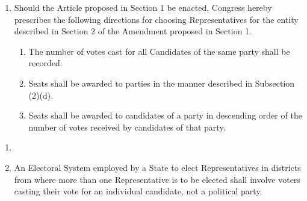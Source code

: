 \documentclass{article}
\begin{document}
    \begin{enumerate}
        \item Should the Article proposed in Section 1 be enacted, Congress hereby prescribes the following directions for choosing Representatives for the entity described in Section 2 of the Amendment proposed in Section 1. 
        \begin{enumerate}
            \item The number of votes cast for all Candidates of the same party shall be recorded.
            \item Seats shall be awarded to parties in the manner described in Subsection (2)(d).
            \item Seats shall be awarded to candidates of a party in descending order of the number of votes received by candidates of that party. 
        \end{enumerate}
    \end{enumerate}  
    \begin{enumerate}
        \item {}
        \item An Electoral System employed by a State to elect Representatives in districts from where more than one Representative is to be elected shall involve voters casting their vote for an individual candidate, not a political party.
    \end{enumerate}
\end{document}
